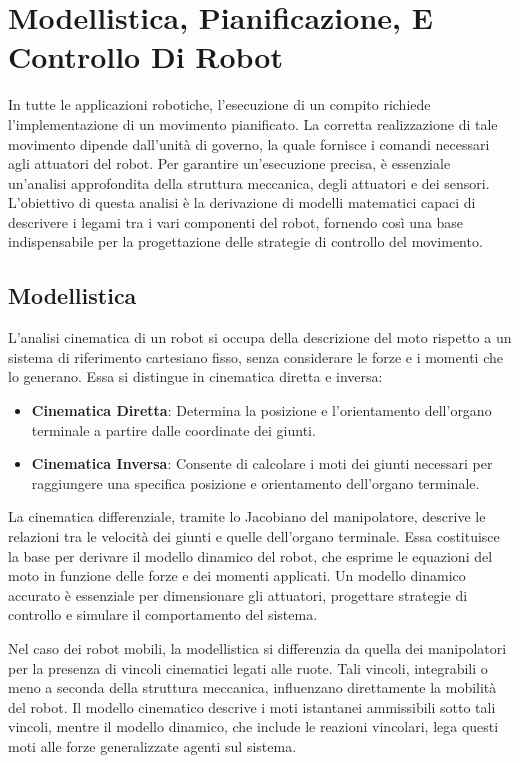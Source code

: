 ﻿\documentclass[11pt, a4paper]{article}
\begin{document}
\newpage
\section{Modellistica, Pianificazione, E Controllo Di Robot}
In tutte le applicazioni robotiche, l'esecuzione di un compito richiede l'implementazione di un movimento pianificato. La corretta realizzazione di tale movimento dipende dall'unità di governo, la quale fornisce i comandi necessari agli attuatori del robot. Per garantire un'esecuzione precisa, è essenziale un'analisi approfondita della struttura meccanica, degli attuatori e dei sensori.
L'obiettivo di questa analisi è la derivazione di modelli matematici capaci di descrivere i legami tra i vari componenti del robot, fornendo così una base indispensabile per la progettazione delle strategie di controllo del movimento.

\subsection{Modellistica}
L'analisi cinematica di un robot si occupa della descrizione del moto rispetto a un sistema di riferimento cartesiano fisso, senza considerare le forze e i momenti che lo generano.
Essa si distingue in cinematica diretta e inversa:
\begin{itemize}
    \item \textbf{Cinematica Diretta}: Determina la posizione e l'orientamento dell'organo terminale a partire dalle coordinate dei giunti.
    \item \textbf{Cinematica Inversa}: Consente di calcolare i moti dei giunti necessari per raggiungere una specifica posizione e orientamento dell'organo terminale.
\end{itemize}

La cinematica differenziale, tramite lo Jacobiano del manipolatore, descrive le relazioni tra le velocità dei giunti e quelle dell'organo terminale. Essa costituisce la base per derivare il modello dinamico del robot, che esprime le equazioni del moto in funzione delle forze e dei momenti applicati. Un modello dinamico accurato è essenziale per dimensionare gli attuatori, progettare strategie di controllo e simulare il comportamento del sistema.

Nel caso dei robot mobili, la modellistica si differenzia da quella dei manipolatori per la presenza di vincoli cinematici legati alle ruote. Tali vincoli, integrabili o meno a seconda della struttura meccanica, influenzano direttamente la mobilità del robot. Il modello cinematico descrive i moti istantanei ammissibili sotto tali vincoli, mentre il modello dinamico, che include le reazioni vincolari, lega questi moti alle forze generalizzate agenti sul sistema.
\end{document}
